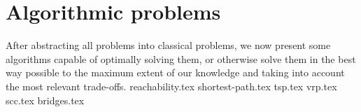 \chapter{Algorithmic problems} \label{algorithm}
After abstracting all problems into classical problems, we now present some algorithms capable of optimally solving them, or otherwise solve them in the best way possible to the maximum extent of our knowledge and taking into account the most relevant trade-offs.
{reachability.tex}
{shortest-path.tex}
{tsp.tex}
{vrp.tex}
{scc.tex}
{bridges.tex}
